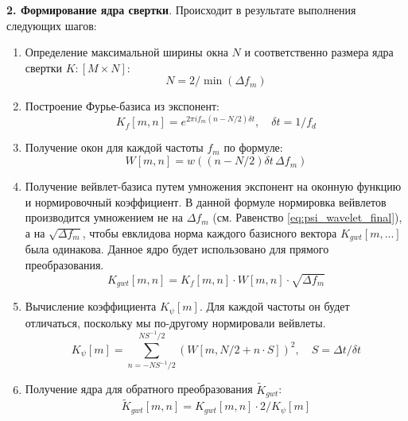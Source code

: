 \textbf{2. Формирование ядра свертки}. Происходит в результате выполнения следующих шагов:
\begin{enumerate}[1.]
  \item Определение максимальной ширины окна $N$ и соответственно размера ядра свертки $K: [M \times N]$:
  \begin{equation}
    N = 2 / \min(\Delta f_m)
  \end{equation}

  \item Построение Фурье-базиса из экспонент:
  \begin{equation}
    K_{f}[m, n] = e^{2\pi i f_m (n - N/2) \delta t}, \quad \delta t = 1 / f_d
  \end{equation}

  \item Получение окон для каждой частоты $f_m$ по формуле:
  \begin{equation}
    W[m, n] = w((n - N/2) \delta t \, \Delta f_m)
  \end{equation}

  \item Получение вейвлет-базиса путем умножения экспонент на оконную функцию и нормировочный коэффициент.
  В данной формуле нормировка вейвлетов производится умножением не на $\Delta f_m$ (см. Равенство \ref{eq:psi_wavelet_final}), 
  а на $\sqrt{\Delta f_m}$, чтобы евклидова норма каждого базисного вектора $K_{gwt}[m, ...]$ была одинакова.
  Данное ядро будет использовано для прямого преобразования.
  \begin{equation}
    K_{gwt}[m, n] = K_{f}[m, n] \cdot W[m, n] \cdot \sqrt{\Delta f_m} 
  \end{equation}

  \item Вычисление коэффициента $K_{\psi}[m]$. Для каждой частоты он будет отличаться, поскольку мы по-другому нормировали вейвлеты.
  \begin{equation}
    K_{\psi}[m] = \sum \limits_{n = -N S^{-1} / 2}^{N S^{-1} / 2}
      (W [m, N/2 + n \cdot S])^2 , \quad
    S = \Delta t / \delta t
  \end{equation}

  \item Получение ядра для обратного преобразования $\tilde{K}_{gwt}$:
  \begin{equation}
    \tilde{K}_{gwt}[m, n] = K_{gwt}[m, n] \cdot 2 / K_{\psi}[m]
  \end{equation}
\end{enumerate}

